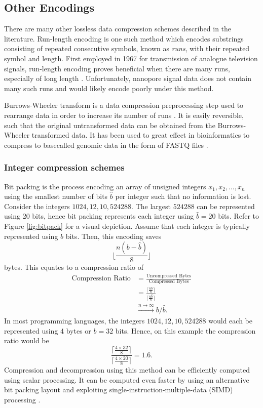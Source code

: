 \subsection{Other Encodings}
\label{sec:data-other}

There are many other lossless data compression schemes described in the literature. Run-length encoding is one such method which encodes substrings consisting of repeated consecutive symbols, known as \textit{runs}, with their repeated symbol and length. First employed in 1967 for transmission of analogue television signals, run-length encoding proves beneficial when there are many runs, especially of long length \cite{rle}. Unfortunately, nanopore signal data does not contain many such runs and would likely encode poorly under this method.

Burrows-Wheeler transform is a data compression preprocessing step used to rearrange data in order to increase its number of runs \cite{bwt}. It is easily reversible, such that the original untransformed data can be obtained from the Burrows-Wheeler transformed data. It has been used to great effect in bioinformatics to compress to basecalled genomic data in the form of FASTQ files \cite{bwt-genomic}.

\subsubsection{Integer compression schemes}
\label{sec:integer-comp}

\label{sec:bitpack} Bit packing is the process encoding an array of unsigned integers $x_1, x_2, \dots, x_n$
using the smallest number of bits $\hat b$ per integer such that no information is lost.
Consider the integers $1024,12,10,\num{524288}$. The largest $\num{524288}$ can be represented using 20 bits, hence bit packing represents each integer using $\hat b = 20$ bits. Refer to Figure \ref{fig:bitpack} for a visual depiction.
Assume that each integer is typically represented using $b$ bits.
Then, this encoding saves
\[\lfloor \frac{n(b-\hat b)}{8}\rfloor\]
bytes. This equates to a compression ratio of
\begin{align*}
	\text{Compression Ratio} &= \frac{\text{Uncompressed Bytes}}{\text{Compressed Bytes}}\\
	&= \frac{\lceil \frac{nb}{8}\rceil}{\lceil \frac{n\hat b}{8}\rceil}\\
	&\stackrel{n\to\infty}{\longrightarrow}b/\hat b.
\end{align*}
In most programming languages, the integers $1024,12,10,\num{524288}$ would each be represented using 4 bytes or $b=32$ bits.
Hence, on this example the compression ratio would be
\[\frac{\lceil \frac{4 \times 32}{8}\rceil}{\lceil \frac{4 \times 20}{8}\rceil} = 1.6.\]
Compression and decompression using this method can be efficiently computed using scalar processing.
It can be computed even faster by using an alternative bit packing layout and exploiting single-instruction-multiple-data (SIMD) processing  \cite{lemire-simd}.

